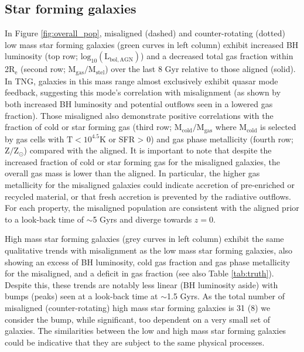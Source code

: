 \subsection{Star forming galaxies}
In Figure \ref{fig:overall_pop}, misaligned (dashed) and counter-rotating (dotted) low mass star forming galaxies (green curves in left column) exhibit increased BH luminosity (top row; $\mathrm{log_{10}(L_{bol, AGN})}$) and a decreased total gas fraction within 2$\mathrm{R_{e}}$ (second row; $\mathrm{M_{gas} / M_{stel}}$) over the last 8 Gyr relative to those aligned (solid). In TNG, galaxies in this mass range almost exclusively exhibit quasar mode feedback, suggesting this mode's correlation with misalignment (as shown by both increased BH luminosity and potential outflows seen in a lowered gas fraction). Those misaligned also demonstrate positive correlations with the fraction of cold or star forming gas (third row; $\mathrm{M_{cold} / M_{gas}}$ where $\mathrm{M_{cold}}$ is selected by gas cells with $\mathrm{T < 10^{4.5}K}$ or SFR > 0) and gas phase metallicity (fourth row; $\mathrm{Z / Z_{\odot}}$) compared with the aligned. 
It is important to note that despite the increased fraction of cold or star forming gas for the misaligned galaxies, the overall gas mass is lower than the aligned. In particular, the higher gas metallicity for the misaligned galaxies could indicate accretion of pre-enriched or recycled material, or that fresh accretion is prevented by the radiative outflows. For each property, the misaligned population are consistent with the aligned prior to a look-back time of $\sim$5 Gyrs and diverge towards $z=0$.

High mass star forming galaxies (grey curves in left column) exhibit the same qualitative trends with misalignment as the low mass star forming galaxies, also showing an excess of BH luminosity, cold gas fraction and gas phase metallicity for the misaligned, and a deficit in gas fraction (see also Table \ref{tab:truth}). Despite this, these trends are notably less linear (BH luminosity aside) with bumps (peaks) seen at a look-back time at $\sim$1.5 Gyrs. As the total number of misaligned (counter-rotating) high mass star forming galaxies is 31 (8) we consider the bump, while significant, too dependent on a very small set of galaxies. The similarities between the low and high mass star forming galaxies could be indicative that they are subject to the same physical processes. 

